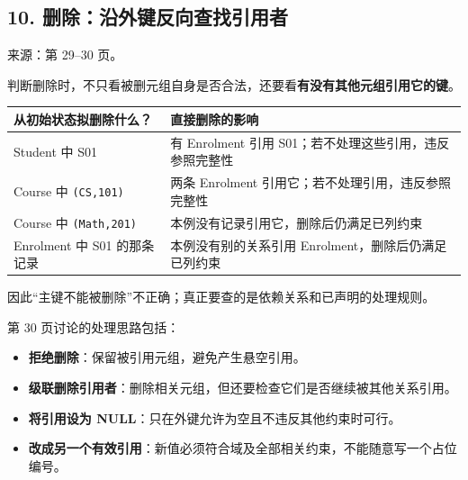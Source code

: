 \subsection{10. 删除：沿外键反向查找引用者}\label{03_relational_model_and_integrity_zh-ux5220ux9664ux6cbfux5916ux952eux53cdux5411ux67e5ux627eux5f15ux7528ux8005}

来源：第 29--30 页。

判断删除时，不只看被删元组自身是否合法，还要看\textbf{有没有其他元组引用它的键}。

\begin{longtable}[]{@{}
  >{\raggedright\arraybackslash}p{}
  >{\raggedright\arraybackslash}p{}@{}}
\toprule\noalign{}
\begin{minipage}[b]{\linewidth}\raggedright
从初始状态拟删除什么？
\end{minipage} & \begin{minipage}[b]{\linewidth}\raggedright
直接删除的影响
\end{minipage} \\
\midrule\noalign{}
\endhead
\bottomrule\noalign{}
\endlastfoot
Student 中 S01 & 有 Enrolment 引用 S01；若不处理这些引用，违反参照完整性 \\
Course 中 \texttt{(\allowbreak{}CS,\allowbreak{}101)\allowbreak{}} & 两条 Enrolment 引用它；若不处理引用，违反参照完整性 \\
Course 中 \texttt{(\allowbreak{}Math,\allowbreak{}201)\allowbreak{}} & 本例没有记录引用它，删除后仍满足已列约束 \\
Enrolment 中 S01 的那条记录 & 本例没有别的关系引用 Enrolment，删除后仍满足已列约束 \\
\end{longtable}

因此``主键不能被删除''不正确；真正要查的是依赖关系和已声明的处理规则。

第 30 页讨论的处理思路包括：

\begin{itemize}
\tightlist
\item
  \textbf{拒绝删除}：保留被引用元组，避免产生悬空引用。
\item
  \textbf{级联删除引用者}：删除相关元组，但还要检查它们是否继续被其他关系引用。
\item
  \textbf{将引用设为 NULL}：只在外键允许为空且不违反其他约束时可行。
\item
  \textbf{改成另一个有效引用}：新值必须符合域及全部相关约束，不能随意写一个占位编号。
\end{itemize}

